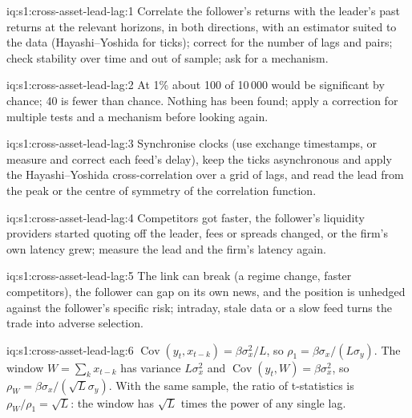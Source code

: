 \begin{solution}{iq:s1:cross-asset-lead-lag:1}
Correlate the follower's returns with the leader's past returns at the relevant horizons, in both directions, with an estimator suited to the data
(Hayashi--Yoshida for ticks); correct for the number of lags and pairs; check stability over time and out of sample; ask for a mechanism.
\end{solution}

\begin{solution}{iq:s1:cross-asset-lead-lag:2}
At 1\% about 100 of 10\,000 would be significant by chance; 40 is fewer than chance. Nothing has been found; apply a correction for multiple tests and a
mechanism before looking again.
\end{solution}

\begin{solution}{iq:s1:cross-asset-lead-lag:3}
Synchronise clocks (use exchange timestamps, or measure and correct each feed's delay), keep the ticks asynchronous and apply the Hayashi--Yoshida
cross-correlation over a grid of lags, and read the lead from the peak or the centre of symmetry of the correlation function.
\end{solution}

\begin{solution}{iq:s1:cross-asset-lead-lag:4}
Competitors got faster, the follower's liquidity providers started quoting off the leader, fees or spreads changed, or the firm's own latency grew;
measure the lead and the firm's latency again.
\end{solution}

\begin{solution}{iq:s1:cross-asset-lead-lag:5}
The link can break (a regime change, faster competitors), the follower can gap on its own news, and the position is unhedged against the follower's
specific risk; intraday, stale data or a slow feed turns the trade into adverse selection.
\end{solution}

\begin{solution}{iq:s1:cross-asset-lead-lag:6}
$\operatorname{Cov}(y_t, x_{t-k}) = \beta\sigma_x^2/L$, so $\rho_1 = \beta\sigma_x/(L\sigma_y)$. The window $W = \sum_k x_{t-k}$ has variance $L\sigma_x^2$ and
$\operatorname{Cov}(y_t, W) = \beta\sigma_x^2$, so $\rho_W = \beta\sigma_x/(\sqrt{L}\sigma_y)$. With the same sample, the ratio of t-statistics is
$\rho_W/\rho_1 = \sqrt{L}$: the window has $\sqrt{L}$ times the power of any single lag.
\end{solution}
